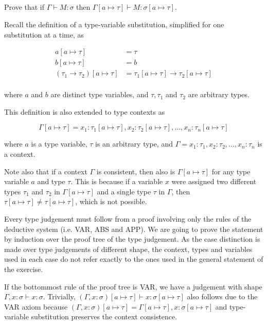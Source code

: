 \documentclass{article}
\begin{document}
\subsection{}\label{ex:5}

Prove that if $\Gamma \vdash M: \sigma$ then 
$\Gamma[a \mapsto \tau] \vdash M: \sigma[a \mapsto \tau]$. 

Recall the definition of a type-variable substitution, simplified 
for one substitution at a time, as

\begin{align*}
  a[a \mapsto \tau] &= \tau \\
  b[a \mapsto \tau] &= b \\
  (\tau_1 \rightarrow \tau_2)[a \mapsto \tau] &= 
    \tau_1[a \mapsto \tau] \rightarrow \tau_2[a \mapsto \tau] \\
\end{align*}

where $a$ and $b$ are distinct type variables, and $\tau, \tau_1$ and 
$\tau_2$ are arbitrary types.

This definition is also extended to type contexts as

$$
  \Gamma[a \mapsto \tau] = 
    x_1: \tau_1[a \mapsto \tau], 
    x_2: \tau_2[a \mapsto \tau], 
    ..., x_n: \tau_n[a \mapsto \tau]
$$

where $a$ is a type variable, $\tau$ is an arbitrary type, and
$\Gamma = x_1: \tau_1, x_2: \tau_2, ..., x_n: \tau_n$ is a context.

Note also that if a context $\Gamma$ is consistent, then also 
is $\Gamma[a \mapsto \tau]$ for any type variable $a$ and type $\tau$.
This is because if a variable $x$ were assigned two different types 
$\tau_1$ and $\tau_2$ in $\Gamma[a \mapsto \tau]$ and a single type 
$\tau$ in $\Gamma$, then $\tau[a \mapsto \tau] \neq \tau[a \mapsto \tau]$,
which is not possible.

Every type judgement must follow from a proof involving
only the rules of the deductive system (i.e. VAR, ABS and APP).
We are going to prove the statement by induction over the 
proof tree of the type judgement. As the case distinction is made
over type judgements of different shape, the context, types and variables 
used in each case do not refer exactly to the ones used in the general 
statement of the exercise.

If the bottommost rule of the proof tree is VAR, we have a judgement 
with shape $\Gamma, x: \sigma \vdash x: \sigma$. Trivially, $(\Gamma, x: \sigma)
[a \mapsto \tau] \vdash x: \sigma[a \mapsto \tau]$ also follows 
due to the VAR axiom because $(\Gamma, x: \sigma)
[a \mapsto \tau] = \Gamma[a \mapsto \tau], x: \sigma[a \mapsto \tau]$
and type-variable substitution preserves the context consistence.
\end{document}
